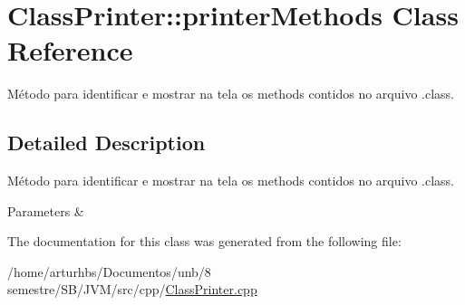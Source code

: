 \hypertarget{classClassPrinter_1_1printerMethods}{}\section{Class\+Printer\+:\+:printer\+Methods Class Reference}
\label{classClassPrinter_1_1printerMethods}


Método para identificar e mostrar na tela os methods contidos no arquivo .class.  




\subsection{Detailed Description}
Método para identificar e mostrar na tela os methods contidos no arquivo .class. 


\begin{DoxyParams}{Parameters}
{\em } & \\
\hline
\end{DoxyParams}


The documentation for this class was generated from the following file\+:\begin{DoxyCompactItemize}
\item 
/home/arturhbs/\+Documentos/unb/8 semestre/\+S\+B/\+J\+V\+M/src/cpp/\hyperlink{ClassPrinter_8cpp}{Class\+Printer.\+cpp}\end{DoxyCompactItemize}
